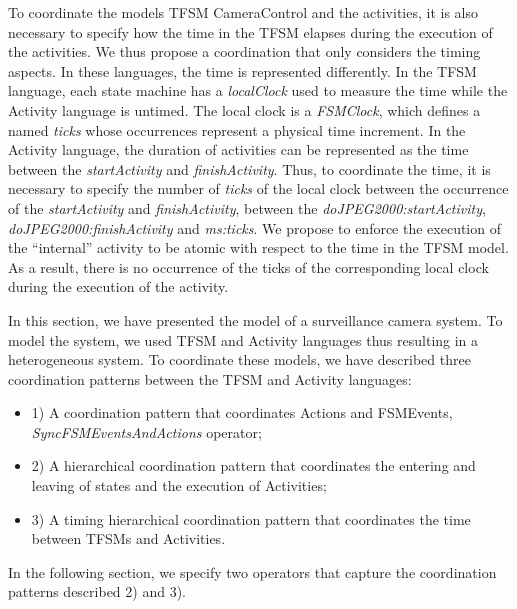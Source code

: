 To coordinate the models TFSM CameraControl and the activities, it is also necessary to specify how the time in the TFSM elapses during the execution of the activities. We thus propose a coordination that only considers the timing aspects. In these languages, the time is represented differently. In the TFSM language, each state machine has a \emph{localClock} used to measure the time while the Activity language is untimed. The local clock is a \emph{FSMClock}, which defines a \dse named \emph{ticks} whose occurrences represent a physical time increment. In the Activity language, the duration of activities can be represented as the time between the \dse \emph{startActivity} and \dse \emph{finishActivity}. Thus, to coordinate the time, it is necessary to specify the number of \emph{ticks} of the local clock between the occurrence of the \dse \emph{startActivity} and \emph{finishActivity}, \eg between the \mse \emph{doJPEG2000:startActivity}, \emph{doJPEG2000:finishActivity} and \emph{ms:ticks}.  We propose to enforce the execution of the ``internal'' activity to be atomic with respect to the time in the TFSM model. As a result, there is no occurrence of the \dse ticks of the corresponding local clock during the execution of the activity.  

In this section, we have presented the model of a surveillance camera system. To model the system, we used TFSM and Activity languages thus resulting in a heterogeneous system. To coordinate these models, we have described three coordination patterns between the TFSM and Activity languages:
	\begin{itemize}
		\item 1) A coordination pattern that coordinates Actions and FSMEvents, \ie \emph{SyncFSMEventsAndActions} operator; 
		\item 2) A hierarchical coordination pattern that coordinates the entering and leaving of states and the execution of Activities; 
		\item 3) A timing hierarchical coordination pattern that coordinates the time between TFSMs and Activities. 
	\end{itemize}
	
In the following section, we specify two \bcool operators that capture the coordination patterns described 2) and 3). 
